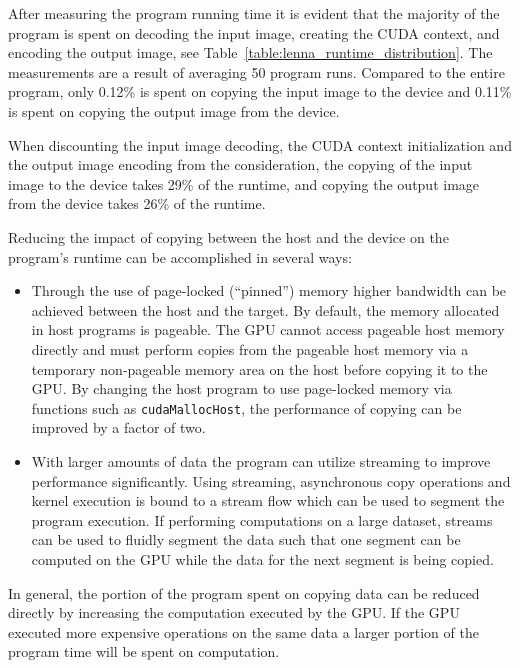 \begin{enumerate}
After measuring the program running time it is evident that the majority of the program is spent on decoding the input image, creating the \ac{CUDA} context, and encoding the output image, see Table~\ref{table:lenna_runtime_distribution}. The measurements are a result of averaging 50 program runs. Compared to the entire program, only 0.12\% is spent on copying the input image to the device and 0.11\% is spent on copying the output image from the device.

When discounting the input image decoding, the \ac{CUDA} context initialization and the output image encoding from the consideration, the copying of the input image to the device takes 29\% of the runtime, and copying the output image from the device takes 26\% of the runtime.

Reducing the impact of copying between the host and the device on the program's runtime can be accomplished in several ways:

\begin{itemize}
\item Through the use of page-locked (``pinned'') memory higher bandwidth can be achieved between the host and the target. By default, the memory allocated in host programs is pageable. The \ac{GPU} cannot access pageable host memory directly and must perform copies from the pageable host memory via a temporary non-pageable memory area on the host before copying it to the \ac{GPU}. By changing the host program to use page-locked memory via functions such as \texttt{cudaMallocHost}, the performance of copying can be improved by a factor of two.

\item With larger amounts of data the program can utilize streaming to improve performance significantly. Using streaming, asynchronous copy operations and kernel execution is bound to a stream flow which can be used to segment the program execution. If performing computations on a large dataset, streams can be used to fluidly segment the data such that one segment can be computed on the \ac{GPU} while the data for the next segment is being copied.
\end{itemize}

In general, the portion of the program spent on copying data can be reduced directly by increasing the computation executed by the \ac{GPU}. If the \ac{GPU} executed more expensive operations on the same data a larger portion of the program time will be spent on computation.


\end{enumerate}
